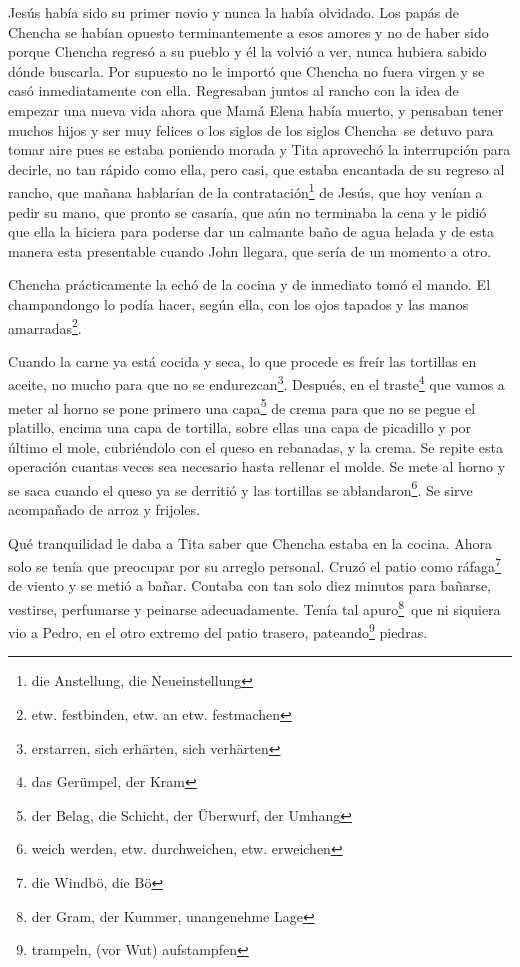 Jesús había sido su primer novio y nunca la había olvidado. Los papás
de Chencha se habían opuesto terminantemente a esos amores y no de haber
sido porque Chencha regresó a su pueblo y él la volvió a ver, nunca
hubiera sabido dónde buscarla. Por supuesto no le importó que Chencha no
fuera virgen y se casó inmediatamente con ella. Regresaban juntos al
rancho con la idea de empezar una nueva vida ahora que Mamá Elena había
muerto, y pensaban tener muchos hijos y ser muy felices o los siglos de
los siglos \ndots
Chencha~se detuvo para tomar aire pues se estaba poniendo morada
y Tita aprovechó la interrupción para decirle, no tan rápido como ella,
pero casi, que estaba encantada de su regreso al rancho, que mañana
hablarían de la contratación\footnote{die Anstellung, die Neueinstellung}
de Jesús, que hoy venían a pedir su mano, que pronto se casaría, que aún
no terminaba la cena y le pidió que ella la hiciera para poderse dar un
calmante baño de agua helada y de esta manera esta presentable cuando
John llegara, que sería de un momento a otro.

Chencha prácticamente la echó de la cocina y de inmediato tomó el mando.
El champandongo lo podía hacer, según ella, con los ojos tapados y las
manos amarradas\footnote{etw. festbinden, etw. an etw. festmachen}.

Cuando la carne ya está cocida y seca, lo que procede es freír las
tortillas en aceite, no mucho para que no se endurezcan\footnote{erstarren, sich erhärten, sich verhärten}.
Después, en el traste\footnote{das Gerümpel, der Kram} que
vamos a meter al horno se pone primero una capa\footnote{der Belag, die Schicht, der Überwurf, der Umhang}
de crema para que no se pegue el platillo, encima una capa de tortilla,
sobre ellas una capa de picadillo y por último el mole, cubriéndolo con
el queso en rebanadas, y la crema. Se repite esta operación cuantas veces
sea necesario hasta rellenar el molde. Se mete al horno y se saca cuando el
queso ya se derritió y las tortillas se ablandaron\footnote{weich werden, etw. durchweichen, etw. erweichen}.
Se sirve acompañado de arroz y frijoles.

Qué tranquilidad le daba a Tita saber que Chencha estaba en la cocina.
Ahora solo se tenía que preocupar por su arreglo personal. Cruzó el
patio como ráfaga\footnote{die Windbö, die Bö} de viento y
se metió a bañar. Contaba con tan solo diez minutos para bañarse, vestirse,
perfumarse y peinarse adecuadamente. Tenía tal apuro\footnote{der Gram, der Kummer, unangenehme Lage}~que ni siquiera vio a Pedro, en el otro extremo del patio trasero, pateando\footnote{trampeln, (vor Wut) aufstampfen}
piedras.

